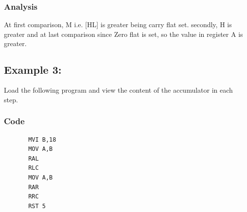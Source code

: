 \documentclass[]{report}
\begin{document}
\subsubsection {Analysis}
At first comparison, M i.e. [HL] is greater being carry flat set. secondly, H is greater and at last comparison since Zero flat is set, so the value in register  A is greater.


\vspace{10mm}
\subsection*{Example 3:}
Load the following program and view the content of the accumulator in each step.
\subsubsection{Code}
\begin{verbatim}
	   MVI B,18
	   MOV A,B
	   RAL
	   RLC
	   MOV A,B
	   RAR
	   RRC
	   RST 5
\end{verbatim}
\end{document}
